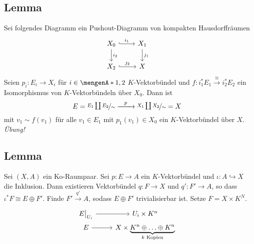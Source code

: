 \subsection{Lemma} %
\label{sub:37}
Sei folgendes Diagramm ein Pushout-Diagramm von kompakten Hausdorffräumen
\[
	\begin{tikzcd}
		X_0 \rar[hook,"i_1"] \dar["i_2"]& X_1 \dar["j_1"] \\
		X_2 \rar[hook,"j_2"] & X
	\end{tikzcd}
\]
Seien $p_i \colon E_i \to X_i$ für $i \in \set{1,2}$ $K$-Vektorbündel und $f \colon i_1^* E_1 \xrightarrow{\cong} i_2^* E_2 $ ein Isomorphismus von $K$-Vektorbündeln über 
$X_0$. Dann ist 
\[
	E = \nicefrac{E_1 \coprod E_2}{\sim} \xrightarrow{\minwidthbox{p}{2em}} \nicefrac{X_1 \coprod X_2 }{\sim}=X
\]
mit $v_1 \sim f(v_1)$ für alle $v_1 \in E_1$ mit $p_1(v_1) \in X_0$ ein $K$-Vektorbündel über $X$.
\emph{Übung!}

\subsection{Lemma} %
\label{sub:38}
Sei $(X,A)$ ein Ko-Raumpaar. Sei $p \colon E \to A$ ein $K$-Vektorbündel und $\iota \colon A \hookrightarrow X$ die Inklusion. Dann existieren Vektorbündel $q \colon F \to X$
und $q' \colon F' \to A$, so dass $\iota^* F \cong E \oplus F'$.
Finde $F' \xrightarrow{q'} A $, sodass $E \oplus F'$ trivialisierbar ist. Setze $F = X \times K^N$.
\[
	\begin{tikzcd}[row sep=0.1em]
		E\big|_{U_i} \rar & U_i \times K^n \\
		E \rar & X \times \Underbrace{K^n \oplus \ldots \oplus K^n}{\text{$k$ Kopien}}
	\end{tikzcd}
\]

